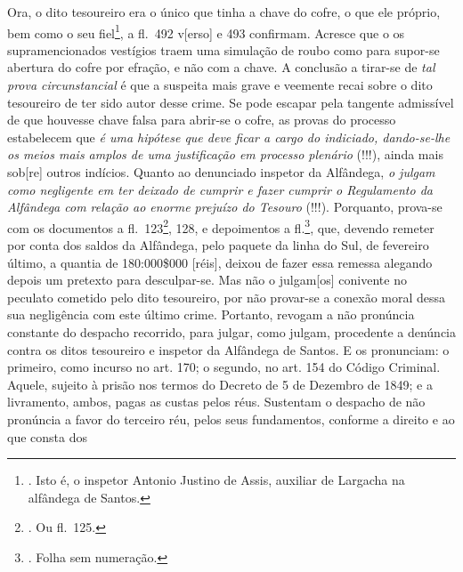 Ora, o dito tesoureiro era o único que tinha a chave do cofre, o que ele
próprio, bem como o seu fiel\footnote{. Isto é, o inspetor Antonio
  Justino de Assis, auxiliar de Largacha na alfândega de Santos.}, a
fl.~492 v{[}erso{]} e 493 confirmam. Acresce que o os supramencionados
vestígios traem uma simulação de roubo como para supor-se abertura do
cofre por efração, e não com a chave. A conclusão a tirar-se de
\emph{tal prova circunstancial} é que a suspeita mais grave e veemente
recai sobre o dito tesoureiro de ter sido autor desse crime. Se pode
escapar pela tangente admissível de que houvesse chave falsa para
abrir-se o cofre, as provas do processo estabelecem que \emph{é uma
hipótese que deve ficar a cargo do indiciado, dando-se-lhe os meios mais
amplos de uma justificação em processo plenário} (!!!), ainda mais
sob{[}re{]} outros indícios. Quanto ao denunciado inspetor da Alfândega,
\emph{o julgam como negligente em ter deixado de cumprir e fazer cumprir
o Regulamento da Alfândega com relação ao enorme prejuízo do Tesouro}
(!!!). Porquanto, prova-se com os documentos a fl.~123\footnote{. Ou
  fl.~125.}, 128, e depoimentos a fl.\footnote{. Folha sem numeração.},
que, devendo remeter por conta dos saldos da Alfândega, pelo paquete da
linha do Sul, de fevereiro último, a quantia de 180:000\$000 {[}réis{]},
deixou de fazer essa remessa alegando depois um pretexto para
desculpar-se. Mas não o julgam{[}os{]} conivente no peculato cometido
pelo dito tesoureiro, por não provar-se a conexão moral dessa sua
negligência com este último crime. Portanto, revogam a não pronúncia
constante do despacho recorrido, para julgar, como julgam, procedente a
denúncia contra os ditos tesoureiro e inspetor da Alfândega de Santos. E
os pronunciam: o primeiro, como incurso no art. 170; o segundo, no art.
154 do Código Criminal. Aquele, sujeito à prisão nos termos do Decreto
de 5 de Dezembro de 1849; e a livramento, ambos, pagas as custas pelos
réus. Sustentam o despacho de não pronúncia a favor do terceiro réu,
pelos seus fundamentos, conforme a direito e ao que consta dos
